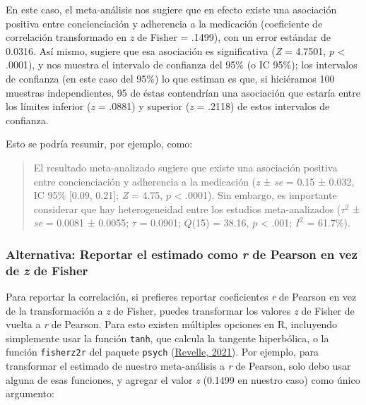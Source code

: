 \documentclass[
  bookmarksnumbered]{article}
\begin{document}
En este caso, el meta-análisis nos sugiere que en efecto existe una asociación positiva entre concienciación y adherencia a la medicación (coeficiente de correlación transformado en \emph{z} de Fisher = .1499), con un error estándar de 0.0316. Así mismo, sugiere que esa asociación es significativa (\emph{Z} = 4.7501, \(p\) \textless{} .0001), y nos muestra el intervalo de confianza del 95\% (o IC 95\%); los intervalos de confianza (en este caso del 95\%) lo que estiman es que, si hiciéramos 100 muestras independientes, 95 de éstas contendrían una asociación que estaría entre los límites inferior (\emph{z} = .0881) y superior (\emph{z} = .2118) de estos intervalos de confianza.

Esto se podría resumir, por ejemplo, como:

\begin{quote}
El resultado meta-analizado sugiere que existe una asociación positiva entre concienciación y adherencia a la medicación (\emph{z} ± \emph{se} = 0.15 ± 0.032, IC 95\% {[}0.09, 0.21{]}; \emph{Z} = 4.75, \(p\) \textless{} .0001). Sin embargo, es importante considerar que hay heterogeneidad entre los estudios meta-analizados (\(\tau^2\) ± \emph{se} = 0.0081 ± 0.0055; \(\tau\) = 0.0901; \(Q\)(15) = 38.16, \(p\) \textless{} .001; \(I^2\) = 61.7\%).
\end{quote}

\hypertarget{alternativa-reportar-el-estimado-como-r-de-pearson-en-vez-de-z-de-fisher}{%
\subsubsection{\texorpdfstring{Alternativa: Reportar el estimado como \emph{r} de Pearson en vez de \emph{z} de Fisher}{Alternativa: Reportar el estimado como r de Pearson en vez de z de Fisher}}\label{alternativa-reportar-el-estimado-como-r-de-pearson-en-vez-de-z-de-fisher}}

Para reportar la correlación, si prefieres reportar coeficientes \emph{r} de Pearson en vez de la transformación a \emph{z} de Fisher, puedes transformar los valores \emph{z} de Fisher de vuelta a \emph{r} de Pearson. Para esto existen múltiples opciones en R, incluyendo simplemente usar la función \texttt{tanh}, que calcula la tangente hiperbólica, o la función \texttt{fisherz2r} del paquete \texttt{psych} (\protect\hyperlink{ref-revellePsych2021}{Revelle, 2021}). Por ejemplo, para transformar el estimado de nuestro meta-análisis a \emph{r} de Pearson, solo debo usar alguna de esas funciones, y agregar el valor \emph{z} (0.1499 en nuestro caso) como único argumento:
\end{document}
